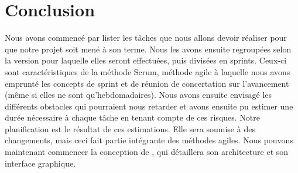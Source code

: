 \section{Conclusion}
    \label{sec:conclusion}

    Nous avons commencé par lister les tâches que nous allons devoir réaliser pour que notre projet soit mené à son terme. Nous les avons ensuite regroupées selon la version pour laquelle elles seront effectuées, puis divisées en sprints. Ceux-ci sont caractéristiques de la méthode Scrum, méthode agile à laquelle nous avons emprunté les concepts de sprint et de réunion de concertation sur l'avancement (même si elles ne sont qu'hebdomadaires). Nous avons ensuite envisagé les différents obstacles qui pourraient nous retarder et avons ensuite pu estimer une durée nécessaire à chaque tâche en tenant compte de ces risques. Notre planification est le résultat de ces estimations. Elle sera soumise à des changements, mais ceci fait partie intégrante des méthodes agiles. Nous pouvons maintenant commencer la conception de \glasir{}, qui détaillera son architecture et son interface graphique.